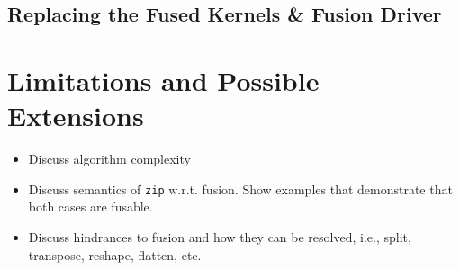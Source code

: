 \documentclass{sigplanconf}  %
\newcommand{\emp}[1]{\textcolor{DikuRed}{ #1}}
\newcommand{\emphh}[1]{\textcolor{CosGreen}{ #1}}
\begin{document}



\subsection{Replacing the Fused Kernels \& Fusion Driver}
\label{sec:fwdPass}


\section{Limitations and Possible Extensions}
\label{sec:Discuss}

\begin{itemize}
    \item Discuss algorithm complexity
    \item Discuss semantics of {\tt zip} w.r.t. fusion. Show examples that
            demonstrate that both cases are fusable.
    \item Discuss hindrances to fusion and how they can be resolved,
            i.e., split, transpose, reshape, flatten, etc. 
\end{itemize}
\end{document}
